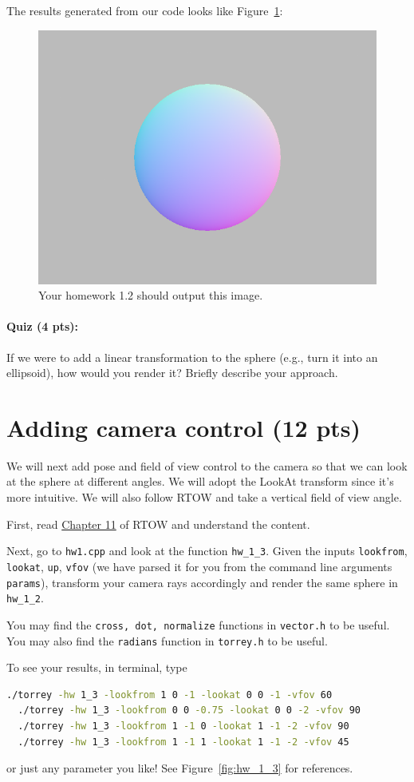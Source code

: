 The results generated from our code looks like Figure~\ref{fig:hw_1_2}:
\begin{figure}[ht]
    \centering
    \includegraphics[width=0.5\linewidth]{imgs/hw_1_2.png}
    \caption{Your homework 1.2 should output this image.}
    \label{fig:hw_1_2}
\end{figure}

\paragraph{Quiz (4 pts):} If we were to add a linear transformation to the sphere (e.g., turn it into an ellipsoid), how would you render it? Briefly describe your approach.

\section{Adding camera control (12 pts)}
We will next add pose and field of view control to the camera so that we can look at the sphere at different angles. We will adopt the LookAt transform since it's more intuitive. We will also follow RTOW and take a vertical field of view angle.

First, read \href{https://raytracing.github.io/books/RayTracingInOneWeekend.html#positionablecamera}{Chapter 11} of RTOW and understand the content.

Next, go to \lstinline{hw1.cpp} and look at the function \lstinline{hw_1_3}. Given the inputs \lstinline{lookfrom}, \lstinline{lookat}, \lstinline{up}, \lstinline{vfov} (we have parsed it for you from the command line arguments \lstinline{params}), transform your camera rays accordingly and render the same sphere in \lstinline{hw_1_2}.

You may find the \lstinline{cross, dot, normalize} functions in \lstinline{vector.h} to be useful.
You may also find the \lstinline{radians} function in \lstinline{torrey.h} to be useful.

To see your results, in terminal, type
\begin{lstlisting}[language=bash]
  ./torrey -hw 1_3 -lookfrom 1 0 -1 -lookat 0 0 -1 -vfov 60
  ./torrey -hw 1_3 -lookfrom 0 0 -0.75 -lookat 0 0 -2 -vfov 90
  ./torrey -hw 1_3 -lookfrom 1 -1 0 -lookat 1 -1 -2 -vfov 90
  ./torrey -hw 1_3 -lookfrom 1 -1 1 -lookat 1 -1 -2 -vfov 45
\end{lstlisting}
or just any parameter you like! See Figure~\ref{fig:hw_1_3} for references.

